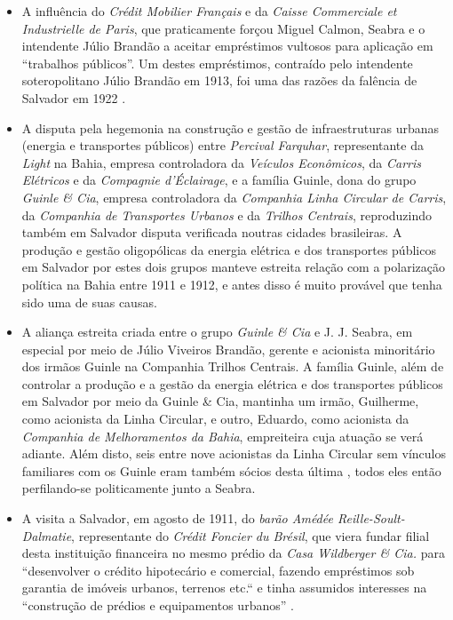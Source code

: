 \begin{itemize}
\item A influência do \textit{Crédit Mobilier Français} e da \textit{Caisse Commerciale et Industrielle de Paris}, que praticamente forçou Miguel Calmon, Seabra e o intendente Júlio Brandão a aceitar empréstimos vultosos para aplicação em ``trabalhos públicos''. Um destes empréstimos, contraído pelo intendente soteropolitano Júlio Brandão em 1913, foi uma das razões da falência de Salvador em 1922 \cite[pp.~119-122,~291]{CUNHA2011}.
\item A disputa pela hegemonia na construção e gestão de infraestruturas urbanas (energia e transportes públicos) entre \textit{Percival Farquhar}, representante da \textit{Light} na Bahia, empresa controladora da \textit{Veículos Econômicos}, da \textit{Carris Elétricos} e da \textit{Compagnie d'Éclairage}, e a família Guinle, dona do grupo \textit{Guinle \& Cia}, empresa controladora da \textit{Companhia Linha Circular de Carris}, da \textit{Companhia de Transportes Urbanos} e da \textit{Trilhos Centrais}, reproduzindo também em Salvador disputa verificada noutras cidades brasileiras. A produção e gestão oligopólicas da energia elétrica e dos transportes públicos em Salvador por estes dois grupos manteve estreita relação com a polarização política na Bahia entre 1911 e 1912, e antes disso é muito provável que tenha sido uma de suas causas.
\item A aliança estreita criada entre o grupo \textit{Guinle \& Cia} e J. J. Seabra, em especial por meio de Júlio Viveiros Brandão, gerente e acionista minoritário dos irmãos Guinle na Companhia Trilhos Centrais. A família Guinle, além de controlar a produção e a gestão da energia elétrica e dos transportes públicos em Salvador por meio da Guinle \& Cia, mantinha um irmão, Guilherme, como acionista da Linha Circular, e outro, Eduardo, como acionista da \textit{Companhia de Melhoramentos da Bahia}, empreiteira cuja atuação se verá adiante. Além disto, seis entre nove acionistas da Linha Circular sem vínculos familiares com os Guinle eram também sócios desta última \cite[pp.~122]{CUNHA2011}, todos eles então perfilando-se politicamente junto a Seabra.
\item A visita a Salvador, em agosto de 1911, do \textit{barão Amédée Reille-Soult-Dalmatie}, representante do \textit{Crédit Foncier du Brésil}, que viera fundar filial desta instituição financeira no mesmo prédio da \textit{Casa Wildberger \& Cia.} para ``desenvolver o crédito hipotecário e comercial, fazendo empréstimos sob garantia de imóveis urbanos, terrenos etc.`` e tinha assumidos interesses na ``construção de prédios e equipamentos urbanos'' \cite[pp.~115-116]{CUNHA2011}.

\end{itemize}
